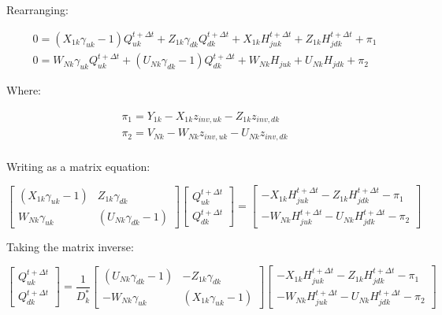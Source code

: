 \documentclass[11pt]{article}
\begin{document}
Rearranging:

\begin{align}
   0 = ( X_{1k} \gamma_{uk} - 1) Q_{uk}^{t + \Delta t} + Z_{1k} \gamma_{dk} Q_{dk}^{t + \Delta t} + X_{1k} H_{juk}^{t + \Delta t} + Z_{1k} H_{jdk}^{t + \Delta t} + \pi_1 \\
   0 = W_{Nk} \gamma_{uk} Q_{uk}^{t + \Delta t} + (U_{Nk} \gamma_{dk} - 1) Q_{dk}^{t + \Delta t} + W_{Nk} H_{juk} + U_{Nk} H_{jdk} + \pi_2
\end{align}

Where:

\begin{align}
 \pi_1 = Y_{1k} - X_{1k} z_{inv, uk} - Z_{1k} z_{inv, dk} \\ 
 \pi_2 = V_{Nk} - W_{Nk} z_{inv, uk} - U_{Nk} z_{inv, dk} \\ 
\end{align}

Writing as a matrix equation:

\begin{equation}
  \begin{bmatrix}
    (X_{1k} \gamma_{uk} - 1) & Z_{1k} \gamma_{dk} \\
    W_{Nk} \gamma_{uk} & (U_{Nk} \gamma_{dk} - 1)
  \end{bmatrix}
  \begin{bmatrix}
   Q_{uk}^{t + \Delta t} \\ Q_{dk}^{t + \Delta t} 
  \end{bmatrix}
  =
  \begin{bmatrix}
   - X_{1k} H_{juk}^{t + \Delta t} - Z_{1k} H_{jdk}^{t + \Delta t} - \pi_1 \\ 
   - W_{Nk} H_{juk}^{t + \Delta t} - U_{Nk} H_{jdk}^{t + \Delta t} - \pi_2
  \end{bmatrix}
\end{equation}

Taking the matrix inverse:

\begin{equation}
  \begin{bmatrix}
   Q_{uk}^{t + \Delta t} \\ Q_{dk}^{t + \Delta t} 
  \end{bmatrix}
  =
  \frac{1}{D_k^*}
  \begin{bmatrix}
    (U_{Nk} \gamma_{dk} - 1) & -Z_{1k} \gamma_{dk} \\
    -W_{Nk} \gamma_{uk} & (X_{1k} \gamma_{uk} - 1)
  \end{bmatrix}
  \begin{bmatrix}
   - X_{1k} H_{juk}^{t + \Delta t} - Z_{1k} H_{jdk}^{t + \Delta t} - \pi_1 \\ 
   - W_{Nk} H_{juk}^{t + \Delta t} - U_{Nk} H_{jdk}^{t + \Delta t} - \pi_2
  \end{bmatrix}
\end{equation}
\end{document}
